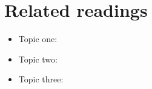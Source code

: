 \section{Related readings}
\label{sec:related-readings}

\begin{itemize}
	\item Topic one: \cite{lazowska1984quantitative,menasce2001capacity}

	\item Topic two: \cite{lazowska1984quantitative,menasce2001capacity}

	\item Topic three: \cite{lazowska1984quantitative,menasce2001capacity}
\end{itemize}
